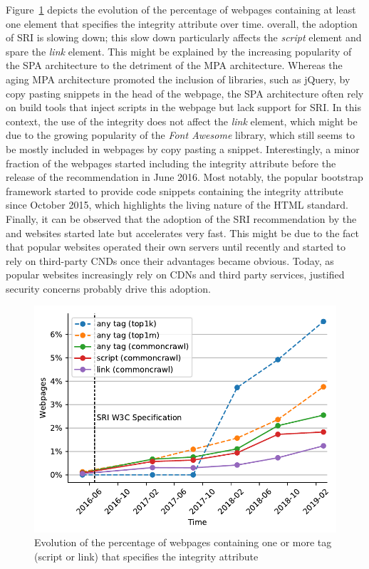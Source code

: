 \documentclass[sigconf,table]{acmart}
\begin{document}
Figure~\ref{fig:02} depicts the evolution of the percentage of webpages containing at least one element that specifies the integrity attribute over time.
overall, the adoption of SRI is slowing down; this slow down particularly affects the \textit{script} element and spare the \textit{link} element.
This might be explained by the increasing popularity of the SPA architecture to the detriment of the MPA architecture.
Whereas the aging MPA architecture promoted the inclusion of libraries, such as jQuery, by copy pasting snippets in the head of the webpage, the SPA architecture often rely on build tools that inject scripts in the webpage but lack support for SRI.
In this context, the use of the integrity does not affect the \textit{link} element, which might be due to the growing popularity of the \textit{Font Awesome} library, which still seems to be mostly included in webpages by copy pasting a snippet.
Interestingly, a minor fraction of the webpages started including the integrity attribute before the release of the recommendation in June 2016.
Most notably, the popular bootstrap framework started to provide code snippets containing the integrity attribute since October 2015, which highlights the living nature of the HTML standard.
Finally, it can be observed that the adoption of the SRI recommendation by the \TopK and \TopM websites started late but accelerates very fast.
This might be due to the fact that popular websites operated their own servers until recently and started to rely on third-party CNDs once their advantages became obvious.
Today, as popular websites increasingly rely on CDNs and third party services, justified security concerns probably drive this adoption.

\begin{figure}[h]
	\includegraphics[width=\columnwidth]{../../notebooks/02_pages_with_sri}
	\caption{Evolution of the percentage of webpages containing one or more tag (script or link) that specifies the integrity attribute}
	\label{fig:02}
\end{figure}
\end{document}
